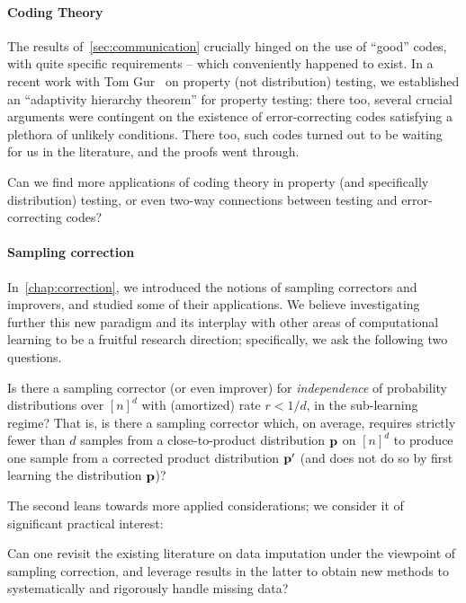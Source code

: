 \paragraph*{Coding Theory} The results of~\cref{sec:communication} crucially hinged on the use of ``good'' codes, with quite specific requirements -- which conveniently happened to exist. In a recent work with Tom Gur~\cite{CG:17} on property (not distribution) testing, we established an ``adaptivity hierarchy theorem'' for property testing: there too, several crucial arguments were contingent on the existence of error-correcting codes satisfying a plethora of unlikely conditions. There too, such codes turned out to be waiting for us in the literature, and the proofs went through.
\begin{question}
  Can we find more applications of coding theory in property (and specifically distribution) testing, or even two-way connections between testing and error-correcting codes?
\end{question}

\paragraph*{Sampling correction} In~\cref{chap:correction}, we introduced the notions of sampling correctors and improvers, and studied some of their applications. We believe investigating further this new paradigm and its interplay with other areas of computational learning to be a fruitful research direction; specifically, we ask the following two questions.
\begin{question}
   Is there a sampling corrector (or even improver) for \emph{independence} of probability distributions over $[n]^d$ with (amortized) rate $r<1/d$, in the sub-learning regime? That is, is there a sampling corrector which, on average, requires strictly fewer than $d$ samples from a close-to-product distribution $\mathbf{p}$ on $[n]^d$ to produce one sample from a corrected product distribution $\mathbf{p}'$ (and does not do so by first learning the distribution $\mathbf{p}$)?
\end{question}
\noindent The second leans towards more applied considerations; we consider it of significant practical interest:
\begin{question}
   Can one revisit the existing literature on data imputation under the viewpoint of sampling correction, and leverage results in the latter to obtain new methods to systematically and rigorously handle missing data?
\end{question}


